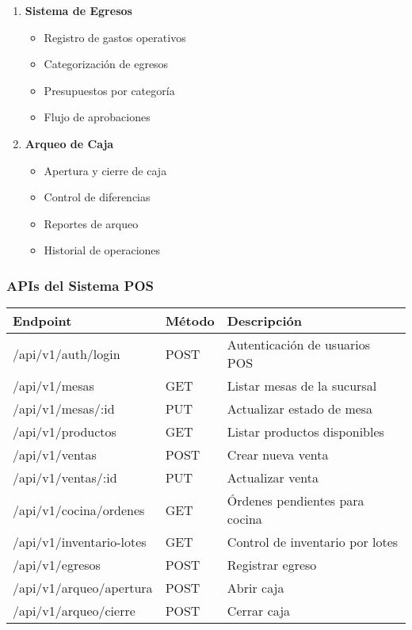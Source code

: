 \documentclass[12pt,a4paper]{article}
\begin{document}
\begin{enumerate}
    \item \textbf{Sistema de Egresos}
    \begin{itemize}
        \item Registro de gastos operativos
        \item Categorización de egresos
        \item Presupuestos por categoría
        \item Flujo de aprobaciones
    \end{itemize}
    
    \item \textbf{Arqueo de Caja}
    \begin{itemize}
        \item Apertura y cierre de caja
        \item Control de diferencias
        \item Reportes de arqueo
        \item Historial de operaciones
    \end{itemize}
\end{enumerate}

\subsubsection{APIs del Sistema POS}
\begin{longtable}{|p{4cm}|p{2cm}|p{7cm}|}
\hline
\textbf{Endpoint} & \textbf{Método} & \textbf{Descripción} \\
\hline
\endhead
/api/v1/auth/login & POST & Autenticación de usuarios POS \\
\hline
/api/v1/mesas & GET & Listar mesas de la sucursal \\
\hline
/api/v1/mesas/:id & PUT & Actualizar estado de mesa \\
\hline
/api/v1/productos & GET & Listar productos disponibles \\
\hline
/api/v1/ventas & POST & Crear nueva venta \\
\hline
/api/v1/ventas/:id & PUT & Actualizar venta \\
\hline
/api/v1/cocina/ordenes & GET & Órdenes pendientes para cocina \\
\hline
/api/v1/inventario-lotes & GET & Control de inventario por lotes \\
\hline
/api/v1/egresos & POST & Registrar egreso \\
\hline
/api/v1/arqueo/apertura & POST & Abrir caja \\
\hline
/api/v1/arqueo/cierre & POST & Cerrar caja \\
\hline
\end{longtable}
\end{document}
